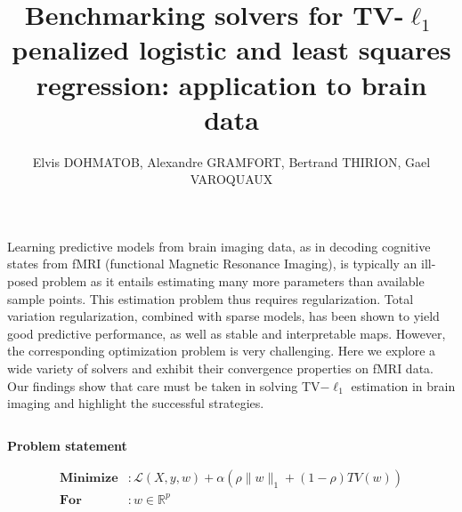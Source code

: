 \documentclass[french]{STIC_poster}
\title{Benchmarking solvers for TV-$\ell_1$ penalized logistic and least squares regression: application to brain data}			%
\author{Elvis DOHMATOB, Alexandre GRAMFORT, Bertrand THIRION, Gael VAROQUAUX}				%
\institute{\inst{1} Parietal Team, INRIA \and %
  \inst{2} affiliation for author2}
\begin{document}
	\begin{frame}[t]
            Learning predictive models from brain imaging data, as in decoding
            cognitive states from fMRI (functional Magnetic Resonance Imaging),
            is typically an ill-posed problem as it
            entails estimating many more parameters than available sample
            points. This estimation problem thus requires regularization. Total
            variation regularization, combined with sparse models, has been shown
            to yield good predictive performance, as well as stable and
            interpretable maps. However, the corresponding optimization problem is
            very challenging. %
            Here we explore a wide variety of solvers and exhibit
            their convergence properties on fMRI data. %
            Our findings show that care must be taken in solving
            TV$-\ell_1$ estimation in brain imaging and highlight the successful strategies.
		\begin{columns}[t]
			\hfill
			\begin{column}{.48\linewidth}
				\begin{sxbox}[\textwidth]{\textbf{Problem statement}}
                                  \begin{notitlebox}[\textwidth]
                                    \begin{equation}
                                      \left .
                                      \begin{split}
                                        \textbf{Minimize} &: \mathcal{L}(X,y,w) + \alpha \left(\rho \|w\|_1 + \left(1-\rho\right)TV(w)\right)\\
                                        \textbf{For} &: w\in\mathbb{R}^p
                                        \label{eq:opt_pb}

\end{split}
\end{equation}
\end{notitlebox}
\end{sxbox}
\end{column}
\end{columns}
\end{frame}
\end{document}
